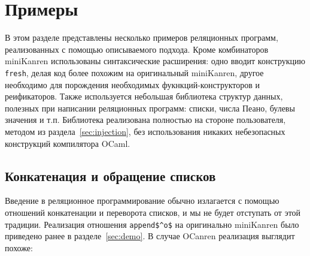 
\section{Примеры}
\label{sec:examples}

В этом разделе представлены несколько примеров реляционных программ, реализованных с помощью описываемого подхода.
Кроме комбинаторов miniKanren использованы синтаксические расширения: одно вводит конструкцию \lstinline|fresh|, делая код более похожим на оригинальный miniKanren,
другое необходимо для порождения необходимых фукнкций-конструкторов и реификаторов.
Также используется небольшая библиотека структур данных, полезных при написании реляционных программ: списки, числа Пеано, булевы значения и т.п.
Библиотека реализована полностью на стороне пользователя, методом из раздела~\ref{sec:injection}, без использования никаких небезопасных конструкций компилятора OCaml.



\subsection{Конкатенация и обращение списков}

Введение в реляционное программирование обычно излагается с помощью отношений конкатенации и переворота списков, и мы не будет отступать от этой традиции.
Реализация отношения  \lstinline|append$^o$| на оригинально miniKanren было приведено ранее в разделе~\ref{sec:demo}.
В случае OCanren реализация выглядит похоже:


